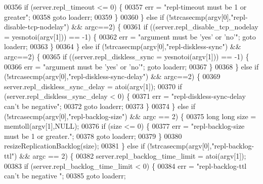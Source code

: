 \begin{DoxyCode}
{{00356             \textcolor{keywordflow}{if} (server.repl\_timeout <= 0) \{
00357                 err = \textcolor{stringliteral}{"repl-timeout must be 1 or greater"};
00358                 \textcolor{keywordflow}{goto} loaderr;
00359             \}
00360         \} \textcolor{keywordflow}{else} \textcolor{keywordflow}{if} (!strcasecmp(argv[0],\textcolor{stringliteral}{"repl-disable-tcp-nodelay"}) && argc==2) \{
00361             \textcolor{keywordflow}{if} ((server.repl\_disable\_tcp\_nodelay = yesnotoi(argv[1])) == -1) \{
00362                 err = \textcolor{stringliteral}{"argument must be 'yes' or 'no'"}; \textcolor{keywordflow}{goto} loaderr;
00363             \}
00364         \} \textcolor{keywordflow}{else} \textcolor{keywordflow}{if} (!strcasecmp(argv[0],\textcolor{stringliteral}{"repl-diskless-sync"}) && argc==2) \{
00365             \textcolor{keywordflow}{if} ((server.repl\_diskless\_sync = yesnotoi(argv[1])) == -1) \{
00366                 err = \textcolor{stringliteral}{"argument must be 'yes' or 'no'"}; \textcolor{keywordflow}{goto} loaderr;
00367             \}
00368         \} \textcolor{keywordflow}{else} \textcolor{keywordflow}{if} (!strcasecmp(argv[0],\textcolor{stringliteral}{"repl-diskless-sync-delay"}) && argc==2) \{
00369             server.repl\_diskless\_sync\_delay = atoi(argv[1]);
00370             \textcolor{keywordflow}{if} (server.repl\_diskless\_sync\_delay < 0) \{
00371                 err = \textcolor{stringliteral}{"repl-diskless-sync-delay can't be negative"};
00372                 \textcolor{keywordflow}{goto} loaderr;
00373             \}
00374         \} \textcolor{keywordflow}{else} \textcolor{keywordflow}{if} (!strcasecmp(argv[0],\textcolor{stringliteral}{"repl-backlog-size"}) && argc == 2) \{
00375             \textcolor{keywordtype}{long} \textcolor{keywordtype}{long} size = memtoll(argv[1],NULL);
00376             \textcolor{keywordflow}{if} (size <= 0) \{
00377                 err = \textcolor{stringliteral}{"repl-backlog-size must be 1 or greater."};
00378                 \textcolor{keywordflow}{goto} loaderr;
00379             \}
00380             resizeReplicationBacklog(size);
00381         \} \textcolor{keywordflow}{else} \textcolor{keywordflow}{if} (!strcasecmp(argv[0],\textcolor{stringliteral}{"repl-backlog-ttl"}) && argc == 2) \{
00382             server.repl\_backlog\_time\_limit = atoi(argv[1]);
00383             \textcolor{keywordflow}{if} (server.repl\_backlog\_time\_limit < 0) \{
00384                 err = \textcolor{stringliteral}{"repl-backlog-ttl can't be negative "};
00385                 \textcolor{keywordflow}{goto} loaderr;
}}
\end{DoxyCode}
